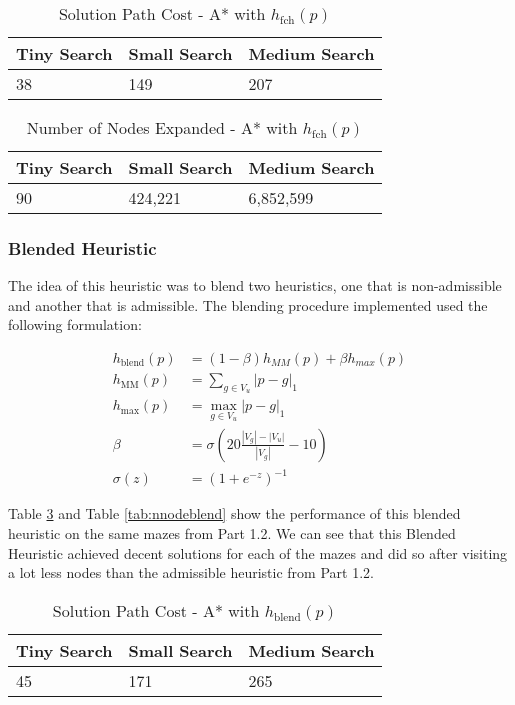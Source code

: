 \documentclass{article}[12pt]
\begin{document}
   
\begin{table}[ht]
   \centering
   \begin{tabular}{l | l | l  }
   \hline
    Tiny Search & Small Search & Medium Search\\
    \hline \hline 
   38 & 149 & 207 \\
   \hline
   \end{tabular}
   \caption{Solution Path Cost - A* with $h_{\text{fch}}(p)$} \label{tab:solfch}
   \end{table}
   
   \begin{table}[ht]
   \centering
   \begin{tabular}{l | l | l  }
   \hline
    Tiny Search & Small Search & Medium Search\\
    \hline \hline 
   90 & 424,221 &  6,852,599\\
   \hline
   \end{tabular}
   \caption{Number of Nodes Expanded - A* with $h_{\text{fch}}(p)$} \label{tab:nnodefch}
   \end{table}   
   
   \subsubsection{Blended Heuristic}
   The idea of this heuristic was to blend two heuristics, one that is non-admissible and another that is admissible. The blending procedure implemented used the following formulation:
   
   \begin{align*}
   h_{\text{blend}}(p) &= \left( 1 - \beta \right) h_{MM}(p) + \beta h_{max}(p) \\
   h_{\text{MM}}(p) &= \sum_{ g \in V_{u} } |p - g|_1 \\
   h_{\text{max}}(p) &= \max_{g \in V_{u} } |p - g|_1 \\
   \beta &= \sigma\left( 20 \frac{|V_g| - |V_u|}{|V_g|} - 10 \right) \\
   \sigma(z) &= \left(1 + e^{-z} \right)^{-1}
   \end{align*}
   
   Table \ref{tab:solblend} and Table \ref{tab:nnodeblend} show the performance of this blended heuristic on the same mazes from Part 1.2. We can see that this Blended Heuristic achieved decent solutions for each of the mazes and did so after visiting a lot less nodes than the admissible heuristic from Part 1.2. 
   
   
   \begin{table}[ht]
   \centering
   \begin{tabular}{l | l | l  }
   \hline
    Tiny Search & Small Search & Medium Search\\
    \hline \hline 
   45 & 171 & 265 \\
   \hline
   \end{tabular}
   \caption{Solution Path Cost - A* with $h_{\text{blend}}(p)$} \label{tab:solblend}
   \end{table}
   
\end{document}
